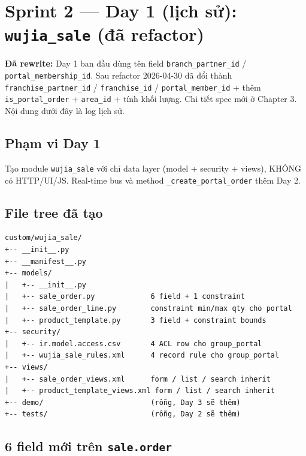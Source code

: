 \chapter{Sprint 2 --- Day 1 (lịch sử): \texttt{wujia\_sale} (đã refactor)}

\textbf{Đã rewrite:} Day 1 ban đầu dùng tên field \texttt{branch\_partner\_id} / \texttt{portal\_membership\_id}. Sau refactor 2026-04-30 đã đổi thành \texttt{franchise\_partner\_id} / \texttt{franchise\_id} / \texttt{portal\_member\_id} + thêm \texttt{is\_portal\_order} + \texttt{area\_id} + tính khối lượng. Chi tiết spec mới ở Chapter 3. Nội dung dưới đây là log lịch sử.

\section{Phạm vi Day 1}

Tạo module \texttt{wujia\_sale} với chỉ data layer (model + security + views), KHÔNG có HTTP/UI/JS. Real-time bus và method \texttt{\_create\_portal\_order} thêm Day 2.

\section{File tree đã tạo}

\begin{lstlisting}[style=shell]
custom/wujia_sale/
+-- __init__.py
+-- __manifest__.py
+-- models/
|   +-- __init__.py
|   +-- sale_order.py             6 field + 1 constraint
|   +-- sale_order_line.py        constraint min/max qty cho portal
|   +-- product_template.py       3 field + constraint bounds
+-- security/
|   +-- ir.model.access.csv       4 ACL row cho group_portal
|   +-- wujia_sale_rules.xml      4 record rule cho group_portal
+-- views/
|   +-- sale_order_views.xml      form / list / search inherit
|   +-- product_template_views.xml form / list / search inherit
+-- demo/                         (rỗng, Day 3 sẽ thêm)
+-- tests/                        (rỗng, Day 2 sẽ thêm)
\end{lstlisting}

\section{6 field mới trên \texttt{sale.order}}

